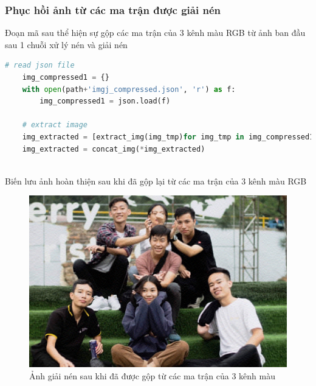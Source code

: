 \subsubsection{Phục hồi ảnh từ các ma trận được giải nén}

Đoạn mã sau thể hiện sự gộp các ma trận của 3 kênh màu RGB từ ảnh ban đầu sau 1 chuỗi xử lý nén và giải nén

\begin{lstlisting}[language=Python]
    # read json file
    img_compressed1 = {}
    with open(path+'imgj_compressed.json', 'r') as f:
        img_compressed1 = json.load(f)

    # extract image
    img_extracted = [extract_img(img_tmp)for img_tmp in img_compressed1]
    img_extracted = concat_img(*img_extracted)
    
\end{lstlisting}

Biến  lưu ảnh hoàn thiện sau khi đã gộp lại từ các ma trận của 3 kênh màu RGB

\begin{center}
    \begin{figure}[htp]
        \begin{center}
            \includegraphics[width=\textwidth,height=\textheight,keepaspectratio]{Chapters/07_DimemsionalityReduction/27_pca/imgg_extracted.jpg}
        \end{center}
        \caption{Ảnh giải nén sau khi đã được gộp từ các ma trận của 3 kênh màu}
        \label{fig:27_8}
    \end{figure}
\end{center}



